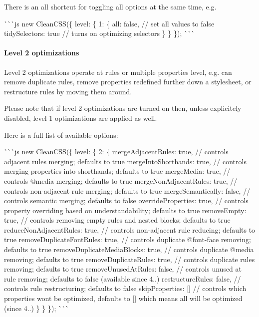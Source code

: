 There is an {\ttfamily all} shortcut for toggling all options at the same time, e.\+g.

\`{}\`{}\`{}js new Clean\+C\+SS(\{ level\+: \{ 1\+: \{ all\+: false, // set all values to {\ttfamily false} tidy\+Selectors\+: true // turns on optimizing selectors \} \} \}); \`{}\`{}\`{}

\paragraph*{Level 2 optimizations}

Level 2 optimizations operate at rules or multiple properties level, e.\+g. can remove duplicate rules, remove properties redefined further down a stylesheet, or restructure rules by moving them around.

Please note that if level 2 optimizations are turned on then, unless explicitely disabled, level 1 optimizations are applied as well.

Here is a full list of available options\+:

\`{}\`{}\`{}js new Clean\+C\+SS(\{ level\+: \{ 2\+: \{ merge\+Adjacent\+Rules\+: true, // controls adjacent rules merging; defaults to true merge\+Into\+Shorthands\+: true, // controls merging properties into shorthands; defaults to true merge\+Media\+: true, // controls {\ttfamily @media} merging; defaults to true merge\+Non\+Adjacent\+Rules\+: true, // controls non-\/adjacent rule merging; defaults to true merge\+Semantically\+: false, // controls semantic merging; defaults to false override\+Properties\+: true, // controls property overriding based on understandability; defaults to true remove\+Empty\+: true, // controls removing empty rules and nested blocks; defaults to {\ttfamily true} reduce\+Non\+Adjacent\+Rules\+: true, // controls non-\/adjacent rule reducing; defaults to true remove\+Duplicate\+Font\+Rules\+: true, // controls duplicate {\ttfamily @font-\/face} removing; defaults to true remove\+Duplicate\+Media\+Blocks\+: true, // controls duplicate {\ttfamily @media} removing; defaults to true remove\+Duplicate\+Rules\+: true, // controls duplicate rules removing; defaults to true remove\+Unused\+At\+Rules\+: false, // controls unused at rule removing; defaults to false (available since 4..) restructure\+Rules\+: false, // controls rule restructuring; defaults to false skip\+Properties\+: \mbox{[}\mbox{]} // controls which properties won\textquotesingle{}t be optimized, defaults to {\ttfamily \mbox{[}\mbox{]}} which means all will be optimized (since 4..) \} \} \}); \`{}\`{}\`{}

